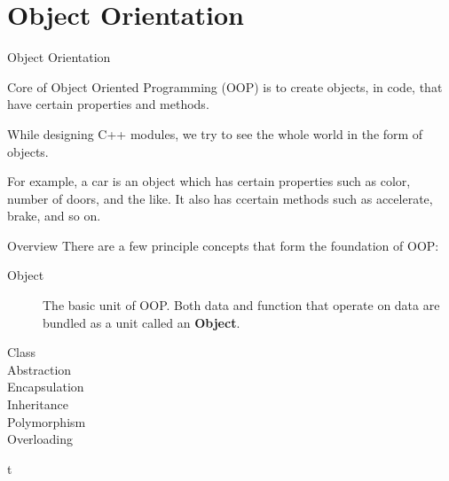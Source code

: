 \documentclass[../lecture5-objectorientation.tex]{subfiles}
\begin{document}
\section{Object Orientation}


\begin{frame}[fragile]{Object Orientation}

    Core of Object Oriented Programming (OOP) is to create objects, in code, that have certain properties and methods. \newline

    While designing C++ modules, we try to see the whole world in the form of objects. \newline

    For example, a car is an object which has certain properties such as color, number of doors, and the like. It also has ccertain methods such as accelerate, brake, and so on.
\end{frame}


\begin{frame}[fragile]{Overview}
    There are a few principle concepts that form the foundation of OOP:
    \begin{description}
        \item[Object] The basic unit of OOP. Both data and function that operate on data are bundled as a unit called an \textbf{Object}.
        \item[Class]
        \item[Abstraction]
        \item[Encapsulation]
        \item[Inheritance]
        \item[Polymorphism]
        \item[Overloading]
    \end{description}
\end{frame}


\begin{frame}[fragile]{}
t
\end{frame}

\end{document}
